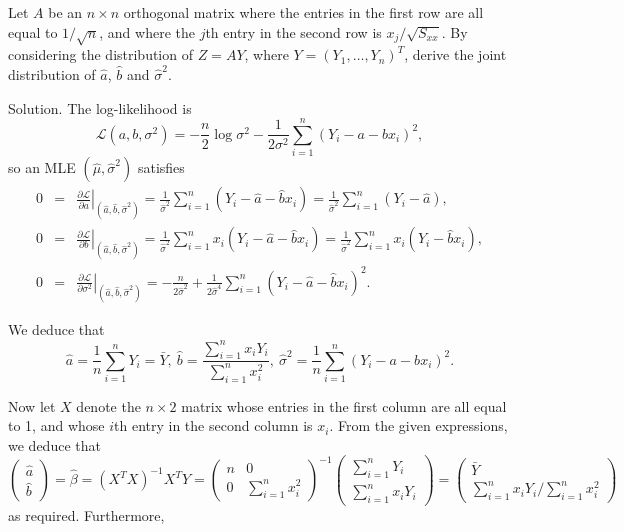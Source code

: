Let $A$ be an $n\times n$ orthogonal matrix where the entries in the first row are all equal to $1/\sqrt{n}$, and where the $j$th entry in the second row is $x_j/\sqrt{S_{xx}}$. By considering the distribution of $Z=AY$, where $Y=(Y_1,\dots,Y_n)^T$, derive the joint distribution of $\hat{a}$, $\hat{b}$ and $\hat{\sigma}^2$.



Solution. The log-likelihood is
\begin{equation}
\mathcal{L}(a,b,\sigma^2) = -\frac{n}{2}\log\sigma^2 - \frac{1}{2\sigma^2}\sum^n_{i=1}(Y_i-a-bx_i)^2,
\end{equation}
so an MLE $\left(\hat{\mu}, \hat{\sigma}^2\right)$ satisfies
\begin{eqnarray}
0 & = & \left.\frac{\partial\mathcal{L}}{\partial a}\right|_{\left(\hat{a}, \hat{b}, \hat{\sigma}^2\right)} = \frac{1}{\hat{\sigma}^2}\sum^n_{i=1}(Y_i-\hat{a}-\hat{b}x_i) =  \frac{1}{\hat{\sigma}^2}\sum^n_{i=1}(Y_i-\hat{a}),  \nonumber\\
0 & = & \left.\frac{\partial\mathcal{L}}{\partial b}\right|_{\left(\hat{a}, \hat{b}, \hat{\sigma}^2\right)} = \frac{1}{\hat{\sigma}^2}\sum^n_{i=1}x_i(Y_i-\hat{a}-\hat{b}x_i) = \frac{1}{\hat{\sigma}^2}\sum^n_{i=1}x_i(Y_i-\hat{b}x_i),    \nonumber\\
0 & = & \left.\frac{\partial\mathcal{L}}{\partial\sigma^2}\right|_{\left(\hat{a}, \hat{b}, \hat{\sigma}^2\right)} = -\frac{n}{2\hat{\sigma}^2} + \frac{1}{2\hat{\sigma}^4}\sum^n_{i=1}(Y_i-\hat{a}-\hat{b}x_i)^2.
\end{eqnarray}

We deduce that
\begin{equation}
\hat{a} = \frac 1n\sum^n_{i=1}Y_i=\bar{Y},\ \hat{b} = \frac{\sum^n_{i=1}x_iY_i}{\sum^n_{i=1}x_i^2},\ \hat{\sigma}^2 = \frac 1n\sum^n_{i=1}(Y_i-a-bx_i)^2.
\end{equation}

Now let $X$ denote the $n\times 2$ matrix whose entries in the first column are all equal to 1, and whose $i$th entry in the second column is $x_i$. From the given expressions, we deduce that
\begin{equation}
\left(\begin{array}{c}
\hat{a} \\
\hat{b}
\end{array}\right)
=\hat{\beta} = (X^TX)^{-1}X^TY =
\left(\begin{array}{cc}
n & 0 \\
0 & \sum^n_{i=1}x_i^2
\end{array}\right)^{-1}
\left(\begin{array}{c}
\sum^n_{i=1}Y_i \\
\sum^n_{i=1}x_iY_i
\end{array}\right)=
\left(\begin{array}{c}
\bar{Y} \\
\sum^n_{i=1}x_iY_i/\sum^n_{i=1}x_i^2
\end{array}\right)
\end{equation}
as required. Furthermore,

